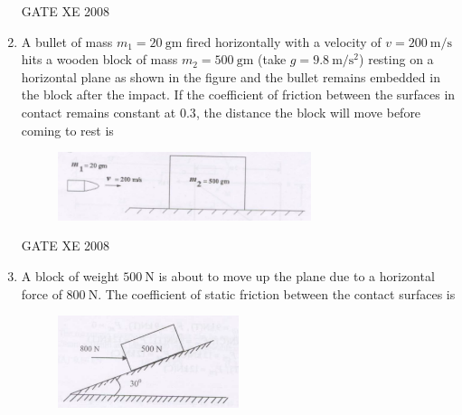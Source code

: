 \documentclass[12pt]{article}
\begin{document}
\begin{enumerate}[label=Q\arabic*.]
\begin{enumerate}[label=(\Alph*)]
\end{enumerate}
    
    GATE XE 2008  

    \item A bullet of mass $m_{1} = 20\ \mathrm{gm}$ fired horizontally with a velocity of $v = 200\ \mathrm{m/s}$ hits a wooden block of mass $m_{2} = 500\ \mathrm{gm}$ (take $g = 9.8\ \mathrm{m/s^{2}}$) resting on a horizontal plane as shown in the figure and the bullet remains embedded in the block after the impact. If the coefficient of friction between the surfaces in contact remains constant at $0.3$, the distance the block will move before coming to rest is 

    \begin{figure}[H]
    \centering
    \includegraphics[width=0.7\textwidth]{figs/ass1_f_q21.png}
    \caption{}
    \end{figure}

\begin{enumerate}[label=(\Alph*)]
\end{enumerate}
    
    GATE XE 2008  

    \item A block of weight $500\ \mathrm{N}$ is about to move up the plane due to a horizontal force of $800\ \mathrm{N}$. The coefficient of static friction between the contact surfaces is 

    \begin{figure}[H]
    \centering
    \includegraphics[width=0.5\textwidth]{figs/ass1_f_q22.png}
    \caption{}
    \end{figure}


\end{enumerate}
\end{document}
